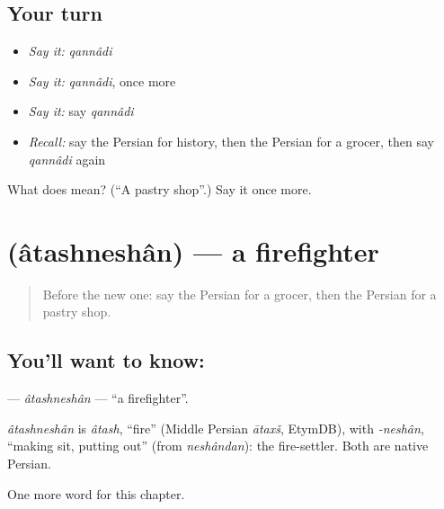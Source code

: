 \subsection*{Your turn}
\begin{itemize}
\raggedright
  \item \emph{Say it:} \emph{qannâdi}
  \item \emph{Say it:} \emph{qannâdi}, once more
  \item \emph{Say it:} say \emph{qannâdi}
  \item \emph{Recall:} say the Persian for history, then the Persian for a grocer, then say \emph{qannâdi} again
\end{itemize}

\begin{tcolorbox}[breakable,colback=teal!4,colframe=teal!35!black,title={Before you move on}]
What does  mean? (\textquotedblleft{}A pastry shop\textquotedblright{}.) Say it once more.
\end{tcolorbox}
\section[\texorpdfstring{\fa{آتش} \fa{نشان} (âtashneshân)}{آتش نشان (âtashneshân)}]{  (âtashneshân) — a firefighter}

\label{lesson:FA-C252-atashneshan}



\begin{quote}
Before the new one: say the Persian for a grocer, then the Persian for a pastry shop.
\end{quote}

\subsection*{You'll want to know:  }
\textbf{ } — \emph{âtashneshân} — \textquotedblleft{}a firefighter\textquotedblright{}.

\begin{cousinweb}
\emph{âtashneshân} is \emph{âtash}, \textquotedblleft{}fire\textquotedblright{} (Middle Persian \emph{ātaxš}, EtymDB), with \emph{-neshân}, \textquotedblleft{}making sit, putting out\textquotedblright{} (from \emph{neshândan}): the fire-settler. Both are native Persian.
\end{cousinweb}

\begin{grammarlens}[title={What you've built}]
One more word for this chapter.
\end{grammarlens}

